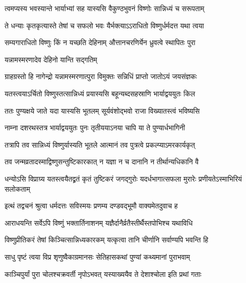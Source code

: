 \twolineshloka
{त्वमप्यस्य भवस्यान्ते भार्याभ्यां सह यास्यसि}
{वैकुण्ठभुवनं विष्णोः सान्निध्यं च सरूपताम्} %

\twolineshloka
{ते धन्याः कृतकृत्यास्ते तेषां च सफलो भवः}
{यैर्भक्त्याऽऽराधितो विष्णुर्धर्मदत्त यथा त्वया} %

\twolineshloka
{सम्यगाराधितो विष्णुः किं न यच्छति देहिनाम्}
{औत्तानचरणिर्येन ध्रुवत्वे स्थापितः पुरा} %


\onelineshloka
{यन्नामस्मरणादेव देहिनो यान्ति सद्गतिम्} %

\twolineshloka
{ग्राहग्रस्तो हि नागेन्द्रो यन्नामस्मरणात्पुरा}
{विमुक्तः सन्निधिं प्राप्तो जातोऽयं जयसंज्ञकः} %

\twolineshloka
{यतस्त्वयाऽर्चितो विष्णुस्तत्सान्निध्यं प्रयास्यसि}
{बहून्यब्दसहस्राणि भार्याद्वययुतः किल} %

\twolineshloka
{ततः पुण्यक्षये जाते यदा यास्यसि भूतलम्}
{सूर्यवंशोद्भवो राजा विख्यातस्त्वं भविष्यसि} %

\twolineshloka
{नाम्ना दशरथस्तत्र भार्याद्वययुतः पुनः}
{तृतीययाऽनया चापि या ते पुण्यार्धभागिनी} %

\twolineshloka
{तत्रापि तव सान्निध्यं विष्णुर्यास्यति भूतले}
{आत्मानं तव पुत्रत्वे प्रकल्प्याऽमरकार्यकृत्} %

\twolineshloka
{तव जन्मव्रतादस्माद्विष्णुसन्तुष्टिकारकात्}
{न यज्ञा न च दानानि न तीर्थान्यधिकानि वै} %

\twolineshloka
{धन्योऽसि विप्राग्र्य यतस्त्वयैतद्व्रतं कृतं तुष्टिकरं जगद्गुरोः}
{यदर्धभागात्सफला मुरारेः प्रणीयतेऽस्माभिरियं सलोकताम्} %





\twolineshloka
{इत्थं तद्वचनं श्रुत्वा धर्मदत्तः सविस्मयः}
{प्रणम्य दण्डवद्भूमौ वाक्यमेतदुवाच ह} %

\twolineshloka
{आराधयन्ति सर्वेऽपि विष्णुं भक्तार्तिनाशनम्}
{यज्ञैर्दानैर्व्रतैस्तीर्थैस्तपोभिश्च यथाविधि} %

\twolineshloka
{विष्णुप्रीतिकरं तेषां किञ्चित्सान्निध्यकारकम्}
{यत्कृत्वा तानि चीर्णानि सर्वाण्यपि भवन्ति हि} %


\twolineshloka
{साधु पृष्टं त्वया विप्र शृणुष्वैकाग्रमानसः}
{सेतिहासकथां पुण्यां कथ्यमानां पुराभवाम्} %


\twolineshloka
{काञ्चिपुर्यां पुरा चोलश्चक्रवर्ती नृपोऽभवत्}
{यस्याख्ययैव ते देशाश्चोला इति प्रथां गताः} %

